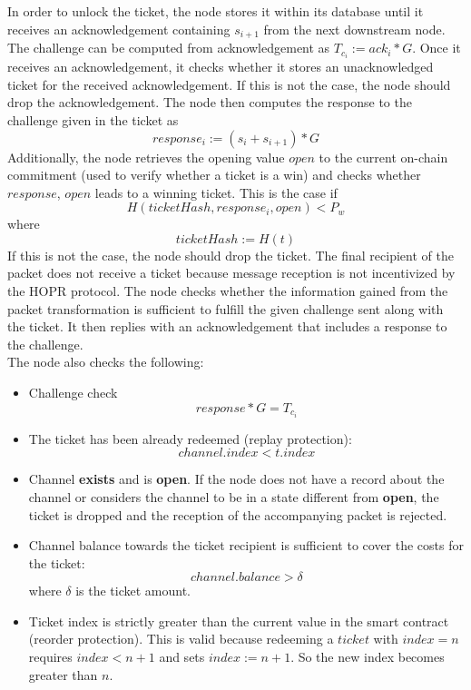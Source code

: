 In order to unlock the ticket, the node stores it within its database until it receives an acknowledgement containing $s_{i+1}$ from the next downstream node. 
The challenge can be computed from acknowledgement as $T_{c_i}:=ack_i*G$.
\newline Once it receives an acknowledgement, it checks whether it stores an unacknowledged ticket for the received acknowledgement. 
If this is not the case, the node should drop the acknowledgement.  
\newline The node then computes the response to the challenge given in the ticket as $$response_i:=(s_i+s_{i+1})*G$$
Additionally, the node retrieves the opening value $open$ to the current on-chain commitment (used to verify whether a ticket is a win) and checks whether $response$, $open$ leads to a winning ticket. 
This is the case if $$H( ticketHash, response_i, open ) <P_w$$ where $$ticketHash:=H(t)$$
If this is not the case, the node should drop the ticket. 
The final recipient of the packet does not receive a ticket because message reception is not incentivized by the HOPR protocol.
\newline The node checks whether the information gained from the packet transformation is sufficient to fulfill the given challenge sent along with the ticket. It then replies with an acknowledgement that includes a response to the challenge.
\\ The node also checks the following:
\begin{itemize}
    \item Challenge check $$response*G=T_{c_i}$$
    \item The ticket has been already redeemed (replay protection): $$channel.index <t.index$$
    \item Channel \textbf{exists} and is \textbf{open}. If the node does not have a record about the channel or considers the channel to be in a state different from \textbf{open}, the ticket is dropped and the reception of the accompanying packet is rejected.
    \item Channel balance towards the ticket recipient is sufficient to cover the costs for the ticket: $$ channel.balance>\delta$$ where $\delta$ is the ticket amount. 
    \item Ticket index is strictly greater than the current value in the smart contract (reorder protection). This is valid because redeeming a $ticket$ with $index=n$ requires $index < n+1$ and sets $index := n+1$. So the new index becomes greater than $n$.


\end{itemize}  








